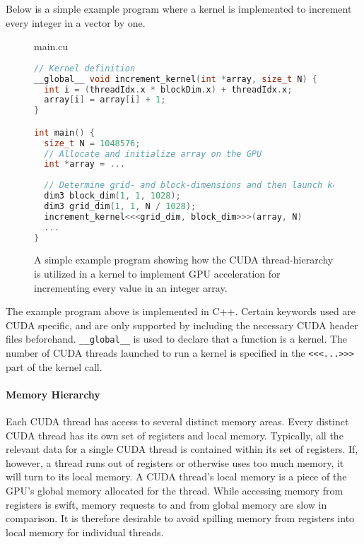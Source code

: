 Below is a simple example program where a kernel is implemented to increment every integer in a vector by one.
\begin{figure}[H]
\begin{center}
main.cu
\end{center}
\begin{lstlisting}[language=C++,style=cppcode]
// Kernel definition
__global__ void increment_kernel(int *array, size_t N) {
  int i = (threadIdx.x * blockDim.x) + threadIdx.x;
  array[i] = array[i] + 1;
}

int main() {
  size_t N = 1048576;
  // Allocate and initialize array on the GPU
  int *array = ...
  
  // Determine grid- and block-dimensions and then launch kernels
  dim3 block_dim(1, 1, 1028);
  dim3 grid_dim(1, 1, N / 1028);
  increment_kernel<<<grid_dim, block_dim>>>(array, N)
  ...
}
\end{lstlisting}
\caption{
  A simple example program showing how the CUDA thread-hierarchy is utilized in a kernel to implement GPU acceleration for incrementing every value in an integer array.
}
\label{background:graphical_processing_units:cuda:example_code}
\end{figure}

\lstset{language=C++,style=cppcode}

The example program above is implemented in C++.
Certain keywords used are CUDA specific, and are only supported by including the necessary CUDA header files beforehand.
\lstinline{__global__} is used to declare that a function is a kernel.
The number of CUDA threads launched to run a kernel is specified in the \lstinline{<<<...>>>} part of the kernel call.

\paragraph{Memory Hierarchy}
Each CUDA thread has access to several distinct memory areas.
Every distinct CUDA thread has its own set of registers and local memory.
Typically, all the relevant data for a single CUDA thread is contained within its set of registers.
If, however, a thread runs out of registers or otherwise uses too much memory, it will turn to its local memory.
A CUDA thread's local memory is a piece of the GPU's global memory allocated for the thread.
While accessing memory from registers is swift, memory requests to and from global memory are slow in comparison.
It is therefore desirable to avoid spilling memory from registers into local memory for individual threads.

